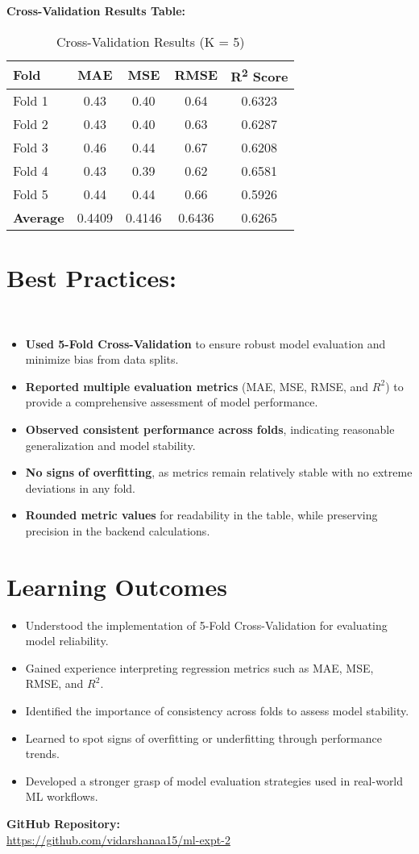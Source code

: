 \documentclass[11pt]{article}
\begin{document}
\textbf{Cross-Validation Results Table:} \\
\begin{table}[h!]
\centering
\begin{tabular}{|l|c|c|c|c|}
\hline
\textbf{Fold} & \textbf{MAE} & \textbf{MSE} & \textbf{RMSE} & \textbf{R\textsuperscript{2} Score} \\
\hline
Fold 1 & 0.43 & 0.40 & 0.64 & 0.6323 \\
Fold 2 & 0.43 & 0.40 & 0.63 & 0.6287 \\
Fold 3 & 0.46 & 0.44 & 0.67 & 0.6208 \\
Fold 4 & 0.43 & 0.39 & 0.62 & 0.6581 \\
Fold 5 & 0.44 & 0.44 & 0.66 & 0.5926 \\
\hline
\textbf{Average} & 0.4409 & 0.4146 & 0.6436 & 0.6265 \\
\hline
\end{tabular}
\caption{Cross-Validation Results (K = 5)}
\end{table}

\section{Best Practices:} \\
\begin{itemize}
    \item \textbf{Used 5-Fold Cross-Validation} to ensure robust model evaluation and minimize bias from data splits.
    \item \textbf{Reported multiple evaluation metrics} (MAE, MSE, RMSE, and $R^2$) to provide a comprehensive assessment of model performance.
    \item \textbf{Observed consistent performance across folds}, indicating reasonable generalization and model stability.
    \item \textbf{No signs of overfitting}, as metrics remain relatively stable with no extreme deviations in any fold.
    \item \textbf{Rounded metric values} for readability in the table, while preserving precision in the backend calculations.
\end{itemize}

\section{Learning Outcomes}
\begin{itemize}
    \item Understood the implementation of 5-Fold Cross-Validation for evaluating model reliability.
    \item Gained experience interpreting regression metrics such as MAE, MSE, RMSE, and $R^2$.
    \item Identified the importance of consistency across folds to assess model stability.
    \item Learned to spot signs of overfitting or underfitting through performance trends.
    \item Developed a stronger grasp of model evaluation strategies used in real-world ML workflows.
\end{itemize}

\vspace{1cm}
\noindent
\textbf{GitHub Repository:} \\
\href{https://github.com/vidarshanaa15/ml-expt-2}{https://github.com/vidarshanaa15/ml-expt-2}
\end{document}
